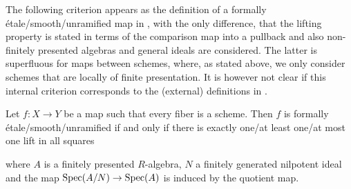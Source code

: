 The following criterion appears as the definition of a formally étale/smooth/unramified map in \cite[§17]{EGAIV4},
with the only difference, that the lifting property is stated in terms of the comparison map into a pullback and also non-finitely presented algebras and general ideals are considered. The latter is superfluous for maps between schemes, where, as stated above, we only consider schemes that are locally of finite presentation. It is however not clear if this internal criterion corresponds to the (external) definitions in \cite[§17]{EGAIV4}.

\begin{remark}
  \label{connection-to-ega-definition}
  Let $f:X\to Y$ be a map such that every fiber is a scheme.
  Then $f$ is formally étale/smooth/unramified if and only if there is exactly one/at least one/at most one lift in all squares
  \begin{center}
  \end{center}
where $A$ is a finitely presented $R$-algebra, $N$ a finitely generated nilpotent ideal and the map $\operatorname{Spec}(A/N)\to\operatorname{Spec}(A)$ is induced by the quotient map.
\end{remark}

